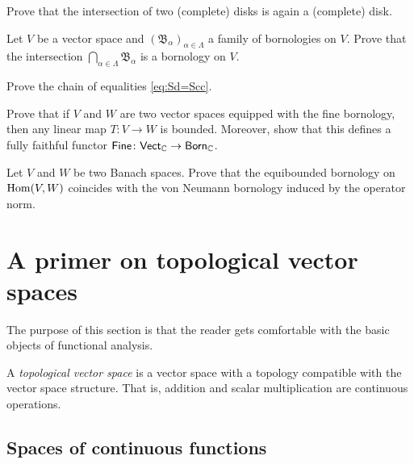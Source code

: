 \begin{exercise} \label{ex:disk-int}
Prove that the intersection of two (complete) disks 
is again a (complete) disk.
\end{exercise}

\begin{exercise}\label{ex:int-bor}
Let $V$ be a vector space and $(\mathfrak{B}_\alpha)_{\alpha \in \Lambda}$ a
family of bornologies on $V$. 
Prove that the intersection $\bigcap_{\alpha \in \Lambda} \mathfrak B_\alpha$
is a bornology on $V$.
\end{exercise}

\begin{exercise} \label{ex:circ-conv=disk}
Prove the chain of equalities \eqref{eq:Sd=Scc}.
\end{exercise}

\begin{exercise} \label{ex:fine}
Prove that if $V$ and $W$ are 
two vector spaces equipped with
the fine bornology, then 
any linear map $T \colon V \to W$
is bounded. Moreover, show that this defines a fully faithful functor $\mathsf{Fine} \colon \mathsf{Vect}_{\mathbb C} \to \mathsf{Born}_\mathbb C$.
\end{exercise}

\begin{exercise} \label{ex:equib-op}
Let $V$ and $W$ be two Banach spaces.
Prove that the equibounded bornology
on $\operatorname{Hom}(V,W)$ coincides with 
the von Neumann bornology induced
by the operator norm.
\end{exercise}
\bigskip

\section{A primer on topological vector spaces}

The purpose of this section is that the reader gets comfortable with the basic objects of functional analysis.

\begin{definition}
A \emph{topological vector space} is a vector space with a topology compatible with the vector space structure. That is, addition and scalar multiplication are continuous operations. 
\end{definition}

\subsection{Spaces of continuous functions}

